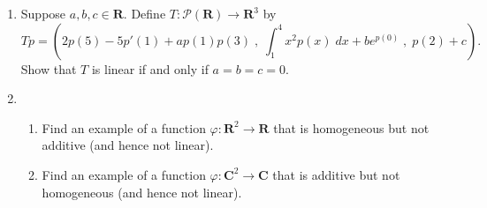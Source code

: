 \documentclass[12pt]{article}
\begin{document}
\begin{enumerate}
\item Suppose $a,b,c \in \mathbf{R}$.  Define $T: \mathcal{P}(\mathbf{R}) \to \mathbf{R}^3$ by
    \[
    Tp = \left( 2p(5)-5p'(1) + a p(1)p(3)\; , \;\int_1^4 x^2p(x)\;dx + b e^{p(0)}\; , \; p(2)+c\right).
    \]
    Show that $T$ is linear if and only if $a=b=c=0$.

\item \begin{enumerate}
        \item Find an example of a function $\varphi : \mathbf{R}^2 \to \mathbf{R}$ that is homogeneous but not additive (and hence not linear).
        \item Find an example of a function $\varphi : \mathbf{C}^2 \to \mathbf{C}$ that is additive but not homogeneous (and hence not linear).
    \end{enumerate}

\end{enumerate}
\end{document}
